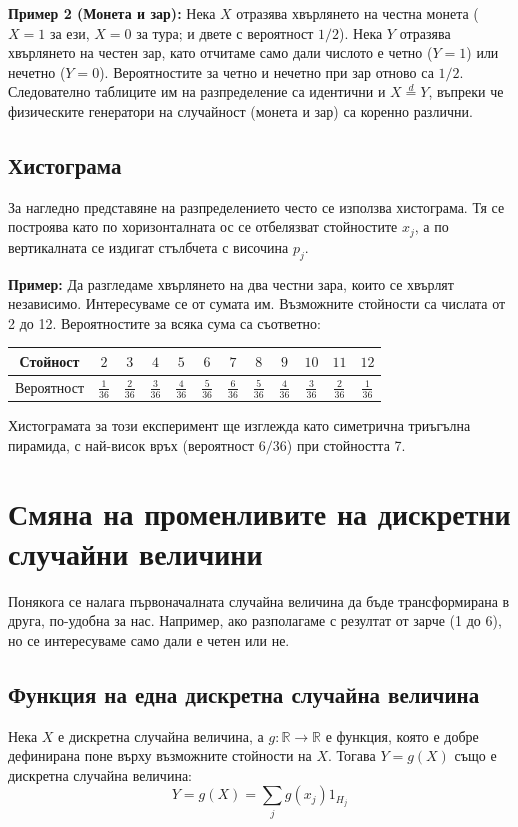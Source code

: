 \documentclass{article}
\begin{document}
\textbf{Пример 2 (Монета и зар):} Нека $X$ отразява хвърлянето на честна монета ($X=1$ за ези, $X=0$ за тура; и двете с вероятност $1/2$). Нека $Y$ отразява хвърлянето на честен зар, като отчитаме само дали числото е четно ($Y=1$) или нечетно ($Y=0$). Вероятностите за четно и нечетно при зар отново са $1/2$. Следователно таблиците им на разпределение са идентични и $X \stackrel{d}{=} Y$, въпреки че физическите генератори на случайност (монета и зар) са коренно различни.

\subsection{Хистограма}
За нагледно представяне на разпределението често се използва хистограма. Тя се построява като по хоризонталната ос се отбелязват стойностите $x_j$, а по вертикалната се издигат стълбчета с височина $p_j$.

\textbf{Пример:} Да разгледаме хвърлянето на два честни зара, които се хвърлят независимо. Интересуваме се от сумата им. Възможните стойности са числата от 2 до 12. Вероятностите за всяка сума са съответно:
\begin{center}
\begin{tabular}{|c|c|c|c|c|c|c|c|c|c|c|c|}
\hline
Стойност & $2$ & $3$ & $4$ & $5$ & $6$ & $7$ & $8$ & $9$ & $10$ & $11$ & $12$ \\
\hline
Вероятност & $\frac{1}{36}$ & $\frac{2}{36}$ & $\frac{3}{36}$ & $\frac{4}{36}$ & $\frac{5}{36}$ & $\frac{6}{36}$ & $\frac{5}{36}$ & $\frac{4}{36}$ & $\frac{3}{36}$ & $\frac{2}{36}$ & $\frac{1}{36}$ \\
\hline
\end{tabular}
\end{center}
Хистограмата за този експеримент ще изглежда като симетрична триъгълна пирамида, с най-висок връх (вероятност $6/36$) при стойността 7.

\section{Смяна на променливите на дискретни случайни величини}

Понякога се налага първоначалната случайна величина да бъде трансформирана в друга, по-удобна за нас. Например, ако разполагаме с резултат от зарче (1 до 6), но се интересуваме само дали е четен или не.

\subsection{Функция на една дискретна случайна величина}
Нека $X$ е дискретна случайна величина, а $g: \mathbb{R} \rightarrow \mathbb{R}$ е функция, която е добре дефинирана поне върху възможните стойности на $X$. Тогава $Y = g(X)$ също е дискретна случайна величина:
\[ Y = g(X) = \sum_{j} g(x_j) 1_{H_j} \]
\end{document}
